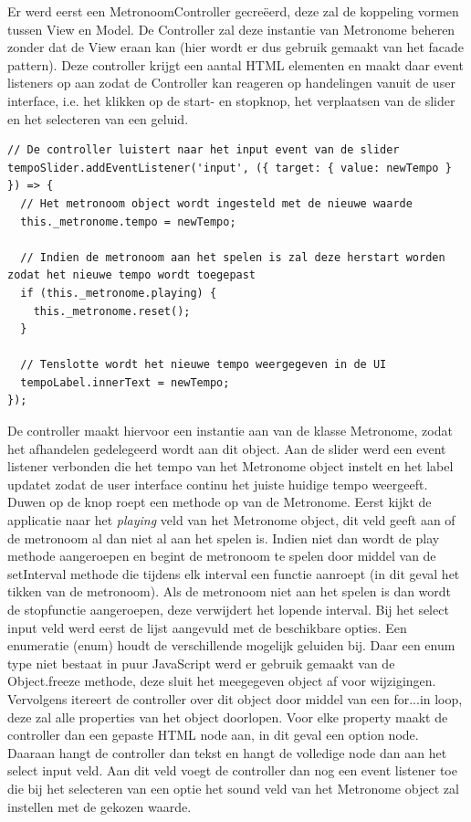  Er werd eerst een MetronoomController gecreëerd, deze zal de koppeling vormen tussen View en Model. De Controller zal deze instantie van Metronome beheren zonder dat de View eraan kan (hier wordt er dus gebruik gemaakt van het facade pattern). Deze controller krijgt een aantal HTML elementen en maakt daar event listeners op aan zodat de Controller kan reageren op handelingen vanuit de user interface, i.e. het klikken op de start- en stopknop, het verplaatsen van de slider en het selecteren van een geluid. 

\begin{lstlisting}[caption=Afhandelen van een event - OOP]
// De controller luistert naar het input event van de slider   
tempoSlider.addEventListener('input', ({ target: { value: newTempo } }) => {
  // Het metronoom object wordt ingesteld met de nieuwe waarde
  this._metronome.tempo = newTempo;

  // Indien de metronoom aan het spelen is zal deze herstart worden zodat het nieuwe tempo wordt toegepast
  if (this._metronome.playing) {
    this._metronome.reset();
  }

  // Tenslotte wordt het nieuwe tempo weergegeven in de UI
  tempoLabel.innerText = newTempo;
});
 \end{lstlisting}

 De controller maakt hiervoor een instantie aan van de klasse Metronome, zodat het afhandelen gedelegeerd wordt aan dit object. 
 Aan de slider werd een event listener verbonden die het tempo van het Metronome object instelt en het label updatet zodat de user interface continu het juiste huidige tempo weergeeft. Duwen op de knop roept een methode op van de Metronome. Eerst kijkt de applicatie naar het \textit{playing} veld van het Metronome object, dit veld geeft aan of de metronoom al dan niet al aan het spelen is. Indien niet dan wordt de play methode aangeroepen en begint de metronoom te spelen door middel van de setInterval methode die tijdens elk interval een functie aanroept (in dit geval het tikken van de metronoom). Als de metronoom niet aan het spelen is dan wordt de stopfunctie aangeroepen, deze verwijdert het lopende interval. Bij het select input veld werd eerst de lijst aangevuld met de beschikbare opties. Een enumeratie (enum) houdt de verschillende mogelijk geluiden bij. Daar een enum type niet bestaat in puur JavaScript werd er gebruik gemaakt van de Object.freeze methode, deze sluit het meegegeven object af voor wijzigingen. Vervolgens itereert de controller over dit object door middel van een for...in loop, deze zal alle properties van het object doorlopen. Voor elke property maakt de controller dan een gepaste HTML node aan, in dit geval een option node. Daaraan hangt de controller dan tekst en hangt de volledige node dan aan het select input veld. Aan dit veld voegt de controller dan nog een event listener toe die bij het selecteren van een optie het sound veld van het Metronome object zal instellen met de gekozen waarde.
 
